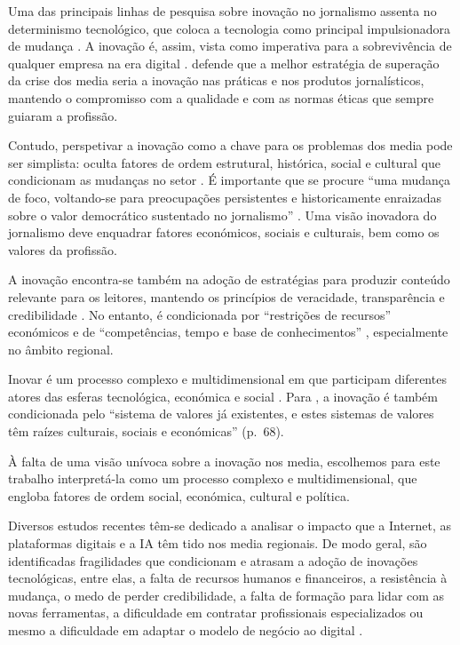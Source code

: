 \documentclass[portuguese]{textolivre}
\begin{document}
Uma das principais linhas de pesquisa sobre inovação no jornalismo
assenta no determinismo tecnológico, que coloca a tecnologia como
principal impulsionadora de mudança \cite{Boczkowski2004,Pavlik2000}. A inovação é, assim, vista como imperativa para a sobrevivência
de qualquer empresa na era digital \cite{Francis2005}. \textcite{pavlik2013innovation}
defende que a melhor estratégia de superação da crise dos media seria a
inovação nas práticas e nos produtos jornalísticos, mantendo o
compromisso com a qualidade e com as normas éticas que sempre guiaram a
profissão.

Contudo, perspetivar a inovação como a chave para os problemas dos media
pode ser simplista: oculta fatores de ordem estrutural, histórica,
social e cultural que condicionam as mudanças no setor \cite{Creech2018,Steensen2011}. É importante que se procure ``uma mudança de
foco, voltando-se para preocupações persistentes e historicamente
enraizadas sobre o valor democrático sustentado no jornalismo'' \cite[p.~194-195]{Creech2018}. Uma visão inovadora do jornalismo deve
enquadrar fatores económicos, sociais e culturais, bem como os valores
da profissão.

A inovação encontra-se também na adoção de estratégias para produzir
conteúdo relevante para os leitores, mantendo os princípios de
veracidade, transparência e credibilidade \cite{GarciaAviles2021}. No
entanto, é condicionada por ``restrições de recursos'' económicos e de
``competências, tempo e base de conhecimentos''
\cite[p.~182]{Francis2005}, especialmente no âmbito regional.

Inovar é um processo complexo e multidimensional em que participam
diferentes atores das esferas tecnológica, económica e social \cite{Dogruel2013,Paulusen2016}. Para \textcite{Ornebring2010}, a inovação é também
condicionada pelo ``sistema de valores já existentes, e estes sistemas
de valores têm raízes culturais, sociais e económicas'' (p.~68).

À falta de uma visão unívoca sobre a inovação nos media, escolhemos para
este trabalho interpretá-la como um processo complexo e
multidimensional, que engloba fatores de ordem social, económica,
cultural e política.

Diversos estudos recentes têm-se dedicado a analisar o impacto que a
Internet, as plataformas digitais e a IA têm tido nos media regionais.
De modo geral, são identificadas fragilidades que condicionam e atrasam
a adoção de inovações tecnológicas, entre elas, a falta de recursos
humanos e financeiros, a resistência à mudança, o medo de perder
credibilidade, a falta de formação para lidar com as novas ferramentas,
a dificuldade em contratar profissionais especializados ou mesmo a
dificuldade em adaptar o modelo de negócio ao digital \cite{Goncalves2024,Morais2023,Jeronimo2022b,Correia2021,Jeronimo2020,Morais2020,Godinho2020,Ramos2020b,Goncalves2020,Jeronimo2015,Carvalheiro2021}.
\end{document}
